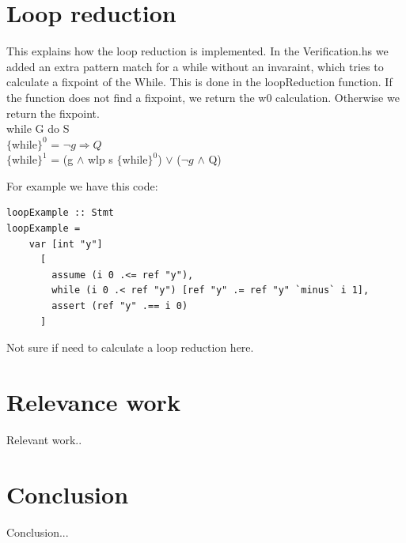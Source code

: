 \documentclass{article}
\begin{document}
\section{Loop reduction}
This explains how the loop reduction is implemented. In the Verification.hs we added an extra pattern match for a while without an invaraint, which tries to calculate a fixpoint of the While. This is done in the loopReduction function. If the function does not find a fixpoint, we return the w0 calculation. Otherwise we return the fixpoint.\\

while G do S\\
$\{$while$\}^{0}$ = $\neg{g} \Rightarrow Q$\\
$\{$while$\}^{1}$ = (g $\wedge$ wlp s $\{$while$\}^{0}$) $\vee$ ($\neg{g}$ $\wedge$ Q)

For example we have this code:

\begin{lstlisting}
loopExample :: Stmt
loopExample = 
	var [int "y"]
      [
        assume (i 0 .<= ref "y"),
        while (i 0 .< ref "y") [ref "y" .= ref "y" `minus` i 1],
        assert (ref "y" .== i 0)
      ]
\end{lstlisting}
Not sure if need to calculate a loop reduction here.
\section{Relevance work}
Relevant work..
\section{Conclusion}
Conclusion...
\end{document}
